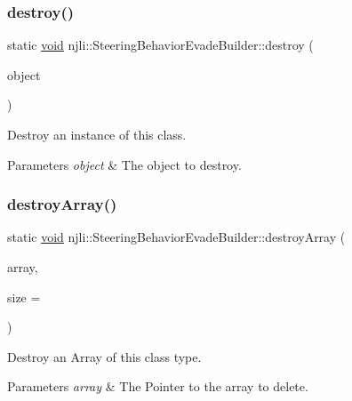 \subsubsection{\texorpdfstring{destroy()}{destroy()}}
{\footnotesize\ttfamily static \mbox{\hyperlink{_thread_8h_af1e856da2e658414cb2456cb6f7ebc66}{void}} njli\+::\+Steering\+Behavior\+Evade\+Builder\+::destroy (\begin{DoxyParamCaption}\item[{\mbox{\hyperlink{classnjli_1_1_steering_behavior_evade_builder}{Steering\+Behavior\+Evade\+Builder}} $\ast$}]{object }\end{DoxyParamCaption})\hspace{0.3cm}{\ttfamily [static]}}

Destroy an instance of this class.


\begin{DoxyParams}{Parameters}
{\em object} & The object to destroy. \\
\hline
\end{DoxyParams}
\mbox{\label{classnjli_1_1_steering_behavior_evade_builder_a0e2d712186d55408630706dc250a0664}} 
\subsubsection{\texorpdfstring{destroy\+Array()}{destroyArray()}}
{\footnotesize\ttfamily static \mbox{\hyperlink{_thread_8h_af1e856da2e658414cb2456cb6f7ebc66}{void}} njli\+::\+Steering\+Behavior\+Evade\+Builder\+::destroy\+Array (\begin{DoxyParamCaption}\item[{\mbox{\hyperlink{classnjli_1_1_steering_behavior_evade_builder}{Steering\+Behavior\+Evade\+Builder}} $\ast$$\ast$}]{array,  }\item[{const \mbox{\hyperlink{_util_8h_a10e94b422ef0c20dcdec20d31a1f5049}{u32}}}]{size = {} }\end{DoxyParamCaption})\hspace{0.3cm}{\ttfamily [static]}}

Destroy an Array of this class type.


\begin{DoxyParams}{Parameters}
{\em array} & The Pointer to the array to delete. \\
\hline
\end{DoxyParams}
\mbox{\label{classnjli_1_1_steering_behavior_evade_builder_a4ebd083f8d91c528047c2a88e1f81e23}} 
